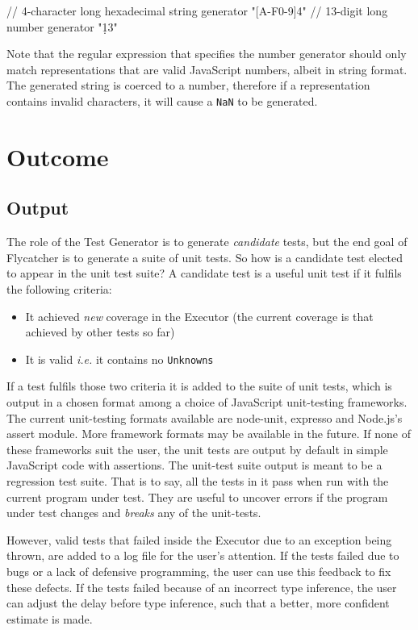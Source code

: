 \begin{code}[caption=Custom data generators,label=custom]
// 4-character long hexadecimal string generator
"[A-F0-9]{4}"
// 13-digit long number generator
"\d{13}"
\end{code}

Note that the regular expression that specifies the number generator should only match representations that are valid JavaScript numbers, albeit in string format. The generated string is coerced to a number, therefore if a representation contains invalid characters, it will cause a \texttt{NaN} to be generated.

\section{Outcome}
\subsection{Output}
The role of the \textsf{Test Generator} is to generate \emph{candidate} tests, but the end goal of \textsf{Flycatcher} is to generate a suite of unit tests. So how is a candidate test elected to appear in the unit test suite? A candidate test is a useful unit test if it fulfils the following criteria:

\begin{itemize}
   \item It achieved \emph{new} coverage in the \textsf{Executor} (the current coverage is that achieved by other tests so far)
   \item It is valid \emph{i.e.} it contains no \texttt{Unknowns}
\end{itemize}

If a test fulfils those two criteria it is added to the suite of unit tests, which is output in a chosen format among a choice of JavaScript unit-testing frameworks. The current unit-testing formats available are \textsf{node-unit}, \textsf{expresso} and \textsf{Node.js}'s \textsf{assert} module. More framework formats may be available in the future. If none of these frameworks suit the user, the unit tests are output by default in simple JavaScript code with assertions. The unit-test suite output is meant to be a regression test suite. That is to say, all the tests in it pass when run with the current program under test. They are useful to uncover errors if the program under test changes and \emph{breaks} any of the unit-tests.

However, valid tests that failed inside the \textsf{Executor} due to an exception being thrown, are added to a log file for the user's attention. If the tests failed due to bugs or a lack of defensive programming, the user can use this feedback to fix these defects. If the tests failed because of an incorrect type inference, the user can adjust the delay before type inference, such that a better, more confident estimate is made.

